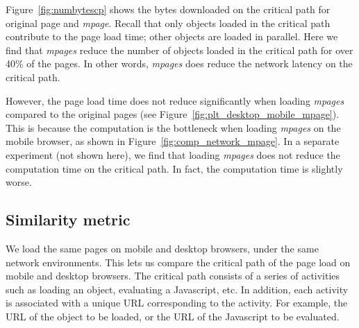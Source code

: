 Figure~\ref{fig:numbytescp} shows the bytes downloaded on the critical path for original page and {\em mpage}. Recall that only objects loaded in the critical path contribute to the page load time; other objects are loaded in parallel. Here we find that {\em mpages} reduce the number of objects loaded in the critical path for over 40\% of the pages. In other words, {\em mpages} does reduce the network latency on the critical path.

However, the page load time does not reduce significantly when loading {\em mpages} compared to the original pages (see Figure~\ref{fig:plt_desktop_mobile_mpage}). This is because the computation is the bottleneck when loading {\em mpages} on the mobile browser, as shown in Figure~\ref{fig:comp_network_mpage}. In a separate experiment (not shown here), we find that loading {\em mpages} does not reduce the computation time on the critical path. In fact, the computation time is slightly worse. 

\subsection{Similarity metric}

We load the same pages on mobile and desktop browsers, under the same network environments. This lets us compare the critical path of the page load on mobile and desktop browsers. The critical path consists of a series of activities such as loading an object, evaluating a Javascript, etc. In addition, each activity is associated with a unique URL corresponding to the activity. For example, the URL of the object to be loaded, or the URL of the Javascript to be evaluated.


